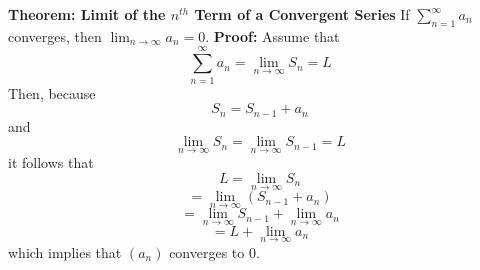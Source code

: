\nopagenumbers
{\bf Theorem: Limit of the $n^{th}$ Term of a Convergent Series}
\vskip 6pt
If $\sum_{n=1}^\infty a_n$ converges, then $\lim_{n\to\infty}a_n=0$.
\vskip 10pt
{\bf Proof:}
\vskip 6pt
Assume that $$\sum_{n=1}^\infty a_n=\lim_{n\to\infty}S_n=L$$ Then, because $$S_n=S_{n-1}+a_n$$ and $$\lim_{n\to\infty}S_n=\lim_{n\to\infty}S_{n-1}=L$$ it follows that $$L=\lim_{n\to\infty}S_n$$ $$=\lim_{n\to\infty} (S_{n-1}+a_n)$$ $$=\lim_{n\to\infty} S_{n-1}+\lim_{n\to\infty}a_n$$ $$=L+\lim_{n\to\infty}a_n$$ which implies that $(a_n)$ converges to $0$.

\vfill\eject
